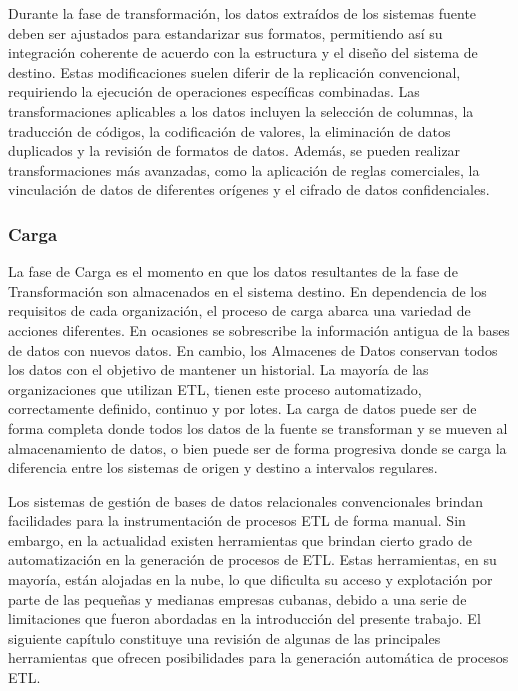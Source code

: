 Durante la fase de transformación, los datos extraídos de los sistemas fuente deben ser ajustados para estandarizar sus formatos, 
permitiendo así su integración coherente de acuerdo con la estructura y el diseño del sistema de destino. Estas modificaciones 
suelen diferir de la replicación convencional, requiriendo la ejecución de operaciones específicas combinadas. Las 
transformaciones aplicables a los datos incluyen la selección de columnas, la traducción de códigos, la codificación 
de valores, la eliminación de datos duplicados y la revisión de formatos de datos. Además, se pueden realizar 
transformaciones más avanzadas, como la aplicación de reglas comerciales, la vinculación de datos de diferentes 
orígenes y el cifrado de datos confidenciales.


\subsubsection{Carga}

La fase de Carga es el momento en que los datos resultantes de la fase de Transformaci\'on son almacenados en el sistema destino. 
En dependencia de los requisitos de cada organización, el proceso de carga abarca una variedad de acciones diferentes. 
En ocasiones se sobrescribe la información antigua de la bases de datos con nuevos datos. En cambio, los Almacenes de Datos 
conservan todos los datos con el objetivo de mantener un historial. La mayoría de las organizaciones que utilizan ETL, 
tienen este proceso automatizado, correctamente definido, continuo y por lotes\cite{ETL_amazon}. La carga de datos puede
ser de forma completa donde todos los datos de la fuente se transforman y se mueven al almacenamiento de datos, o bien 
puede ser de forma progresiva donde se carga la diferencia entre los sistemas de origen y destino a intervalos regulares.

Los sistemas de gesti\'on de bases de datos relacionales convencionales brindan facilidades para la instrumentaci\'on 
de procesos ETL de forma manual. Sin embargo, en la actualidad existen herramientas que brindan cierto grado de 
automatizaci\'on en la generación de procesos de ETL. Estas herramientas, en su mayoría, est\'an alojadas en la 
nube, lo que dificulta su acceso y explotaci\'on por parte de las pequeñas y medianas empresas cubanas, debido 
a una serie de limitaciones que fueron abordadas en la introducci\'on del presente trabajo. El siguiente 
cap\'itulo constituye una revisi\'on de algunas de las principales herramientas que ofrecen posibilidades 
para la generación autom\'atica de procesos ETL. 
